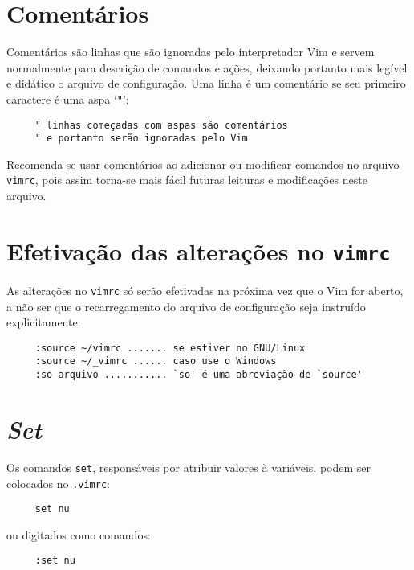 \section{Comentários }
\label{Comentários }

Comentários são linhas que são ignoradas pelo interpretador Vim e servem
normalmente para descrição de comandos e ações, deixando portanto mais legível
e didático o arquivo de configuração. Uma linha é um comentário se seu
primeiro caractere é uma aspa `\verb+"+':

\begin{verbatim}
     " linhas começadas com aspas são comentários
     " e portanto serão ignoradas pelo Vim
\end{verbatim}

Recomenda-se usar comentários ao adicionar ou modificar comandos no arquivo
{\tt vimrc}, pois assim torna-se mais fácil futuras leituras e modificações
neste arquivo.

\section{Efetivação das alterações no {\tt vimrc}}
\label{Efetivação das alterações no vimrc}

As alterações no {\tt vimrc} só serão efetivadas na próxima vez que o Vim for
aberto, a não ser que o recarregamento do arquivo de configuração seja
instruído explicitamente:

\begin{verbatim}
     :source ~/vimrc ....... se estiver no GNU/Linux
     :source ~/_vimrc ...... caso use o Windows
     :so arquivo ........... `so' é uma abreviação de `source'
\end{verbatim}

\section{{\em Set}}
\label{Set}

Os comandos {\tt set}, responsáveis por atribuir valores à variáveis,
 podem ser colocados no \verb|.vimrc|:

\begin{verbatim}
     set nu
\end{verbatim}

ou digitados como comandos:

\begin{verbatim}
     :set nu
\end{verbatim}


